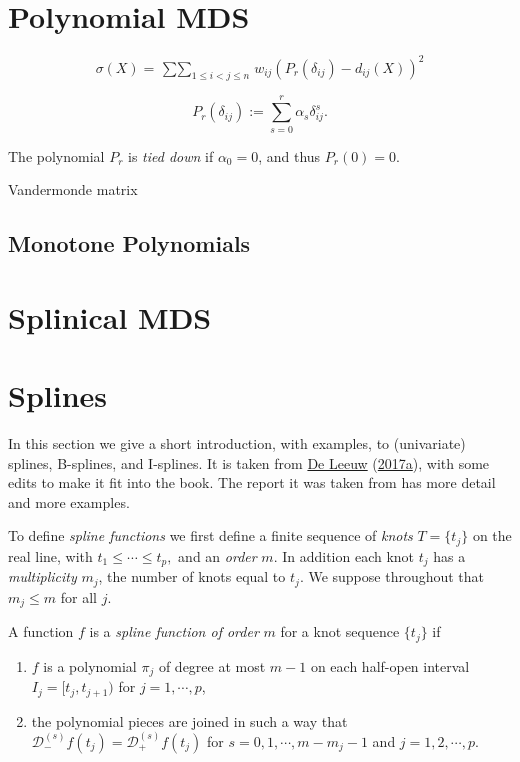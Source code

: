 \documentclass[
  12pt,
]{book}
\providecommand{\tightlist}{%
  \setlength{\itemsep}{0pt}\setlength{\parskip}{0pt}}
\theoremstyle{definition}
\theoremstyle{definition}
\theoremstyle{definition}
\theoremstyle{definition}
\theoremstyle{remark}
\begin{document}
\hypertarget{polynomial-mds}{%
\section{Polynomial MDS}\label{polynomial-mds}}

\[
\sigma(X)=\mathop{\sum\sum}_{1\leq i<j\leq n}w_{ij}(P_r(\delta_{ij})-d_{ij}(X))^2
\]

\[
P_r(\delta_{ij}):=\sum_{s=0}^r\alpha_s^{\ }\delta_{ij}^s.
\]

The polynomial \(P_r\) is \emph{tied down} if \(\alpha_0=0\), and thus \(P_r(0)=0\).

Vandermonde matrix

\hypertarget{monotone-polynomials}{%
\subsection{Monotone Polynomials}\label{monotone-polynomials}}

\hypertarget{splinical-mds}{%
\section{Splinical MDS}\label{splinical-mds}}

\hypertarget{mathsplines}{%
\section{Splines}\label{mathsplines}}

In this section we give a short introduction, with examples, to (univariate) splines, B-splines, and I-splines. It is taken from \protect\hyperlink{ref-deleeuw_E_17i}{De Leeuw} (\protect\hyperlink{ref-deleeuw_E_17i}{2017a}), with some edits to make it fit into the book. The report it was taken from has more detail and more examples.

To define \emph{spline functions} we first define a finite sequence of \emph{knots} \(T=\{t_j\}\) on the real line, with \(t_1\leq\cdots\leq t_p,\) and an \emph{order} \(m\). In addition each knot \(t_j\) has a \emph{multiplicity} \(m_j\), the number of knots equal to \(t_j\). We suppose throughout that \(m_j\leq m\) for all \(j\).

A function \(f\) is a \emph{spline function of order} \(m\) for a knot sequence \(\{t_j\}\) if

\begin{enumerate}
\def\labelenumi{\arabic{enumi}.}
\tightlist
\item
  \(f\) is a polynomial \(\pi_j\) of degree at most \(m-1\) on each half-open interval \(I_j=[t_j,t_{j+1})\) for \(j=1,\cdots,p\),
\item
  the polynomial pieces are joined in such a way that \(\mathcal{D}^{(s)}_-f(t_j)=\mathcal{D}^{(s)}_+f(t_j)\) for \(s=0,1,\cdots,m-m_j-1\) and \(j=1,2,\cdots,p\).
\end{enumerate}
\end{document}
